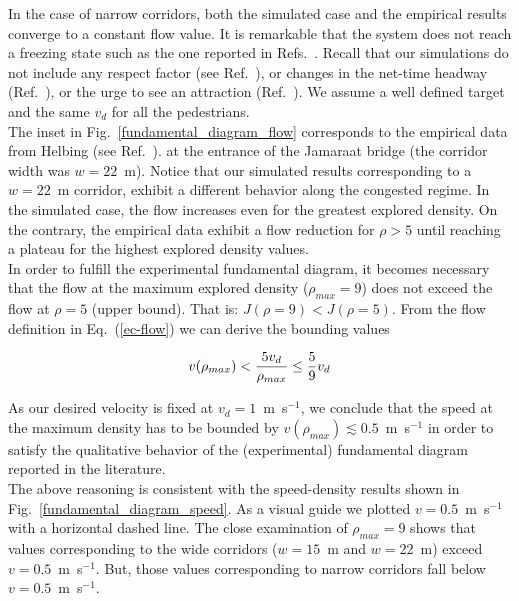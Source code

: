 \documentclass[preprint,12pt]{elsarticle}
\begin{document}
In the case of narrow corridors, both the simulated case and the empirical results converge to a constant flow value. It is remarkable that the system does not reach a freezing state such as the one reported in Refs.~\cite{kwak,lin}. Recall that our simulations do not include any respect factor (see Ref.~\cite{parisi2}), or changes in the net-time headway (Ref.~\cite{helbing3}), or the urge to see an attraction (Ref.~\cite{kwak}). We assume a well defined target and the same $v_d$ for all the pedestrians.\\

The inset in Fig.~\ref{fundamental_diagram_flow} corresponds to the empirical data from Helbing (see Ref.~\cite{helbing3}). at the entrance of the Jamaraat bridge (the corridor width was $w=22$~m). Notice that our simulated results corresponding to a $w=22$~m corridor, exhibit a different behavior along the congested regime. In the simulated case, the flow increases even for the greatest explored density. On the contrary, the empirical data exhibit a flow reduction for $\rho > 5$ until reaching a plateau for the highest explored density values.  \\

In order to fulfill the experimental fundamental diagram, it becomes necessary that the flow at the maximum explored density ($\rho_{max} = 9$) does not exceed the flow at $\rho = 5$ (upper bound). That is:  $J(\rho = 9) < J(\rho = 5)$. From the flow definition in Eq.~(\ref{ec-flow}) we can derive the bounding values

\begin{equation}
v(\rho_{max}) < \frac{5v_d}{\rho_{max}} \leq \frac{5}{9} v_d\\
\end{equation}

As our desired velocity is fixed at $v_d = 1$~m~s$^{-1}$, we conclude that the speed at 
the maximum density has to be bounded by $v(\rho_{max}) \lesssim  0.5$~m~s$^{-1}$ in 
order to satisfy the qualitative behavior of the (experimental) fundamental 
diagram reported in the literature.\\

The above reasoning is consistent with the speed-density results shown in Fig.~\ref{fundamental_diagram_speed}. As a visual guide we plotted $v=0.5$~m~s$^{-1}$ with a horizontal dashed line. The close examination of $\rho_{max} = 9$ shows that values corresponding to the wide corridors ($w=15$~m and $w=22$~m) exceed $v=0.5$~m~s$^{-1}$. But, those values corresponding to narrow corridors fall below $v=0.5$~m~s$^{-1}$. \\
\end{document}

